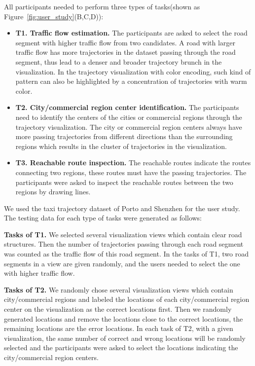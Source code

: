 All participants needed to perform three types of tasks(shown as Figure~\ref{fig:user_study}(B,C,D)):
\begin{itemize}[noitemsep]
	\item \textbf{T1. Traffic flow estimation.} 
	The participants are asked to select the road segment with higher traffic flow from two candidates.
	A road with larger traffic flow has more trajectories in the dataset passing through the road segment, thus lead to a denser and broader trajectory brunch in the visualization.  In the trajectory visualization with color encoding, such kind of pattern can also be highlighted by a concentration of trajectories with warm color.
	\item \textbf{T2. City/commercial region center identification.} The participants need to identify the centers of the cities or commercial regions through the trajectory visualization. The city or commercial region centers always have more passing trajectories from different directions than the surrounding regions which results in the   cluster of trajectories in the visualization.
	\item \textbf{T3. Reachable route inspection.} The reachable routes indicate the routes connecting two regions, these routes must have the passing trajectories. The participants were asked to inspect the reachable routes between the two regions by drawing lines. 
\end{itemize}

We used the taxi trajectory dataset of Porto and Shenzhen for the user study. The testing data for each type of tasks were generated as follows:

\textbf{Tasks of T1.} We selected several visualization views which contain clear road structures. Then the number of trajectories passing through each road segment was counted as the traffic flow of this road segment. In the tasks of T1, two road segments in a view are given randomly, and the users needed to select the one with higher traffic flow.  

\textbf{Tasks of T2.} We randomly chose several visualization views which contain city/commercial regions and labeled the locations of each city/commercial region center on the visualization as the correct locations first.  Then we randomly generated locations and remove the locations close to the correct locations, the remaining locations are the error locations. In each task of T2, with a given visualization, the same number of correct and wrong locations will be randomly selected and the participants were asked to select the locations indicating the city/commercial region centers. 

